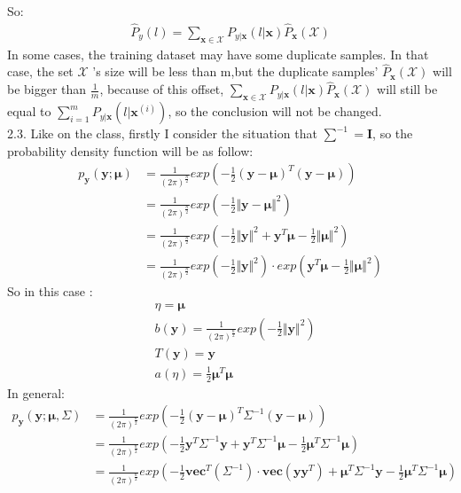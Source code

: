 \documentclass[a4paper]{article}
\begin{document}
So:
  \begin{equation*}
\begin{aligned}
\hat{P}_y(l) = \sum_{\mathbf{x} \in \mathcal{X}}P_{y|\mathbf{x}}(l|\mathbf{x})\hat{P}_{\mathbf{x}}(\mathcal{X})
\end{aligned}
\end{equation*}
In some cases, the training dataset may have some duplicate samples. In that case, the set $\mathcal{X}$ 's size will be less than m,but the duplicate samples' $\hat{P}_{\mathbf{x}}(\mathcal{X})$ will be bigger than $\frac 1 m$, because of this offset, $ \sum_{\mathbf{x} \in \mathcal{X}}P_{y|\mathbf{x}}(l|\mathbf{x})\hat{P}_{\mathbf{x}}(\mathcal{X})$ will still be equal to $\sum_{i=1}^m P_{y|\mathbf{x}}(l|\mathbf{x}^{(i)})$, so the conclusion will not be changed. 
$$$$
2.3. Like on the class, firstly I consider the situation that $\sum ^{-1} = \mathbf{I}$, so the probability density function will be as follow:
  \begin{equation*}
\begin{aligned}
p_{\mathbf{y}}(\mathbf{y};\mathbf{\mu}) &= \frac {1}{(2 \pi)^{\frac n 2}} exp(-\frac 1 2 (\mathbf{y} - \mathbf{\mu})^T(\mathbf{y} - \mathbf{\mu}))\\
&= \frac {1}{(2 \pi)^{\frac n 2}} exp(-\frac 1 2 \Vert \mathbf{y} - \mathbf{\mu}\Vert^2)\\
&= \frac {1}{(2 \pi)^{\frac n 2}} exp(-\frac 1 2 \Vert \mathbf{y} \Vert^2 +  \mathbf{y}^T\mathbf{\mu} - \frac 1 2 \Vert \mathbf{\mu}\Vert^2)\\
&=\frac {1}{(2 \pi)^{\frac n 2}} exp(-\frac 1 2 \Vert \mathbf{y} \Vert^2)\cdot exp(\mathbf{y}^T\mathbf{\mu} - \frac 1 2 \Vert \mathbf{\mu}\Vert^2)
\end{aligned}
\end{equation*}
So in this case :
  \begin{equation*}
\begin{aligned}
&\eta = \mathbf{\mu} \\
&b(\mathbf{y}) = \frac {1}{(2 \pi)^{\frac n 2}} exp(-\frac 1 2 \Vert \mathbf{y} \Vert^2)\\
&T(\mathbf{y}) = \mathbf{y}\\
&a(\eta) = \frac 1 2 \mathbf{\mu}^T\mathbf{\mu}
\end{aligned}
\end{equation*}
In general:
\begin{equation*}
\begin{aligned}
p_{\mathbf{y}}(\mathbf{y};\mathbf{\mu},\Sigma) &= \frac {1}{(2 \pi)^{\frac n 2}} exp(-\frac 1 2 (\mathbf{y} - \mathbf{\mu})^T \Sigma^{-1} (\mathbf{y} - \mathbf{\mu}))\\
&= \frac {1}{(2 \pi)^{\frac n 2}} exp(-\frac 1 2  \mathbf{y}^T \Sigma^{-1}\mathbf{y} + \mathbf{y}^T\Sigma^{-1}\mathbf{\mu} - \frac 1 2  \mathbf{\mu}^T \Sigma^{-1}\mathbf{\mu} )\\
&= \frac {1}{(2 \pi)^{\frac n 2}} exp(-\frac 1 2 \mathbf{vec}^T({\Sigma}^{-1})\cdot  \mathbf{vec}(\mathbf{yy}^T) +\mathbf{\mu}^T\Sigma^{-1}\mathbf{y}  -\frac 1 2  \mathbf{\mu}^T \Sigma^{-1}\mathbf{\mu})
\end{aligned}
\end{equation*}
\end{document}
